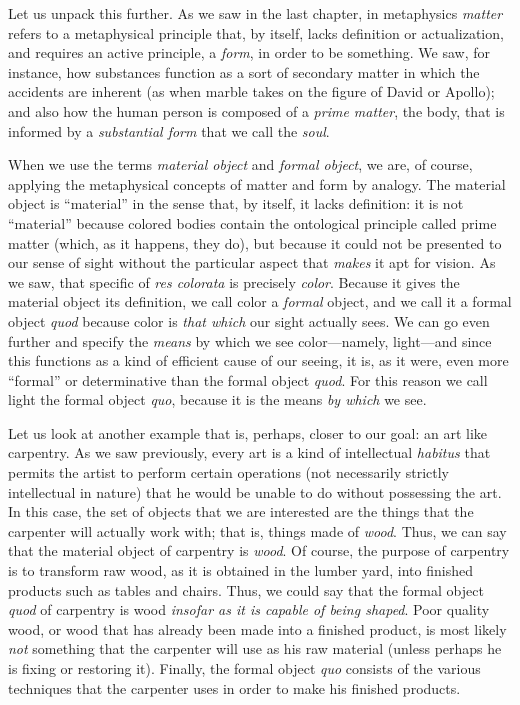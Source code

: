 \documentclass[
  12pt,
]{memoir}
\begin{document}
Let us unpack this further. As we saw in the last chapter, in
metaphysics \emph{matter} refers to a metaphysical principle that, by
itself, lacks definition or actualization, and requires an active
principle, a \emph{form}, in order to be something. We saw, for
instance, how substances function as a sort of secondary matter in which
the accidents are inherent (as when marble takes on the figure of David
or Apollo); and also how the human person is composed of a \emph{prime
matter}, the body, that is informed by a \emph{substantial form} that we
call the \emph{soul}.

When we use the terms \emph{material object} and \emph{formal object},
we are, of course, applying the metaphysical concepts of matter and form
by analogy. The material object is ``material'' in the sense that, by
itself, it lacks definition: it is not ``material'' because colored
bodies contain the ontological principle called prime matter (which, as
it happens, they do), but because it could not be presented to our sense
of sight without the particular aspect that \emph{makes} it apt for
vision. As we saw, that specific of \emph{res colorata} is precisely
\emph{color}. Because it gives the material object its definition, we
call color a \emph{formal} object, and we call it a formal object
\emph{quod} because color is \emph{that which} our sight actually sees.
We can go even further and specify the \emph{means} by which we see
color---namely, light---and since this functions as a kind of efficient
cause of our seeing, it is, as it were, even more ``formal'' or
determinative than the formal object \emph{quod}. For this reason we
call light the formal object \emph{quo}, because it is the means
\emph{by which} we see.

Let us look at another example that is, perhaps, closer to our goal: an
art like carpentry. As we saw previously, every art is a kind of
intellectual \emph{habitus} that permits the artist to perform certain
operations (not necessarily strictly intellectual in nature) that he
would be unable to do without possessing the art. In this case, the set
of objects that we are interested are the things that the carpenter will
actually work with; that is, things made of \emph{wood}. Thus, we can
say that the material object of carpentry is \emph{wood}. Of course, the
purpose of carpentry is to transform raw wood, as it is obtained in the
lumber yard, into finished products such as tables and chairs. Thus, we
could say that the formal object \emph{quod} of carpentry is wood
\emph{insofar as it is capable of being shaped}. Poor quality wood, or
wood that has already been made into a finished product, is most likely
\emph{not} something that the carpenter will use as his raw material
(unless perhaps he is fixing or restoring it). Finally, the formal
object \emph{quo} consists of the various techniques that the carpenter
uses in order to make his finished products.
\end{document}
